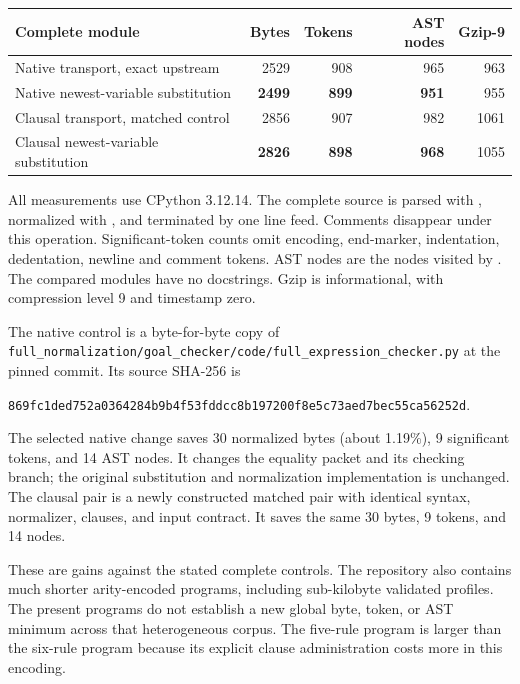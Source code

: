 \documentclass[11pt]{article}
\theoremstyle{definition}
\theoremstyle{remark}
\newcommand{\code}[1]{\texttt{\detokenize{#1}}}
\begin{document}
\begin{center}
\begin{tabular}{lrrrr}
\toprule
Complete module & Bytes & Tokens & AST nodes & Gzip-9\\
\midrule
Native transport, exact upstream & 2529 & 908 & 965 & 963\\
Native newest-variable substitution & \textbf{2499} & \textbf{899} & \textbf{951} & 955\\
\midrule
Clausal transport, matched control & 2856 & 907 & 982 & 1061\\
Clausal newest-variable substitution & \textbf{2826} & \textbf{898} & \textbf{968} & 1055\\
\bottomrule
\end{tabular}
\end{center}

All measurements use CPython 3.12.14. The complete source is parsed with
\code{ast.parse}, normalized with \code{ast.unparse}, and terminated by one
line feed. Comments disappear under this operation. Significant-token
counts omit encoding, end-marker, indentation, dedentation, newline and
comment tokens. AST nodes are the nodes visited by \code{ast.walk}.
The compared modules have no docstrings. Gzip is informational, with
compression level 9 and timestamp zero.

The native control is a byte-for-byte copy of
\nolinkurl{full_normalization/goal_checker/code/full_expression_checker.py}
at the pinned commit. Its source SHA-256 is
\begin{center}\small
\texttt{869fc1ded752a0364284b9b4f53fddcc8b197200f8e5c73aed7bec55ca56252d}.
\end{center}
The selected native change saves 30 normalized bytes (about 1.19\%),
9 significant tokens, and 14 AST nodes. It changes the equality packet
and its checking branch; the original substitution and normalization
implementation is unchanged. The clausal pair is a newly constructed
matched pair with identical syntax, normalizer, clauses, and input contract.
It saves the same 30 bytes, 9 tokens, and 14 nodes.

These are gains against the stated complete controls. The repository also
contains much shorter arity-encoded programs, including sub-kilobyte
validated profiles. The present programs do not establish a new global
byte, token, or AST minimum across that heterogeneous corpus.
The five-rule program is larger than the six-rule program because its
explicit clause administration costs more in this encoding.
\end{document}
